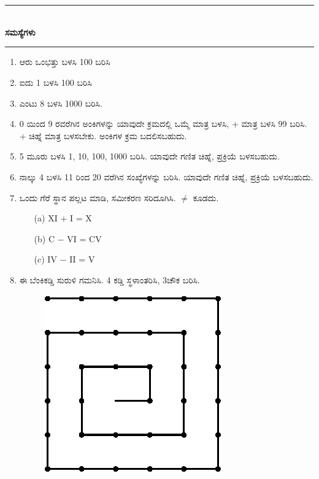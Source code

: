 \chapter[ಅಧ್ಯಾಯ 12]{}\label{chap12}

\begin{center}
\rule{5cm}{1pt}\\[5pt]
{\Large\bfseries ಸಮಸ್ಯೆಗಳು}\\[3pt]
\rule{5cm}{1pt}
\end{center}

\begin{enumerate}
\renewcommand{\labelenumi}{\bf\theenumi.}
\itemsep=5pt

\item ಆರು ಒಂಭತ್ತು ಬಳಸಿ 100 ಬರಿಸಿ 

\item ಐದು 1 ಬಳಸಿ 100 ಬರಿಸಿ

\item ಎಂಟು 8 ಬಳಸಿ 1000 ಬರಿಸಿ. 

\item 0 ಯಿಂದ 9 ರವರೆಗಿನ ಅಂಕಿಗಳನ್ನು ಯಾವುದೇ ಕ್ರಮದಲ್ಲಿ ಒಮ್ಮೆ ಮಾತ್ರ ಬಳಸಿ, $+$ ಮಾತ್ರ ಬಳಸಿ 99 ಬರಿಸಿ. $+$ ಚಿಹ್ನೆ ಮಾತ್ರ ಬಳಸಬೇಕು. ಅಂಕಿಗಳ ಕ್ರಮ ಬದಲಿಸ\break ಬಹುದು.

\item 5 ಮೂರು ಬಳಸಿ 1, 10, 100, 1000 ಬರಿಸಿ. ಯಾವುದೇ ಗಣಿತ ಚಿಹ್ನೆ, ಪ್ರಕ್ರಿಯೆ ಬಳಸಬಹುದು. 

\item ನಾಲ್ಕು 4 ಬಳಸಿ 11 ರಿಂದ 20 ವರೆಗಿನ ಸಂಖ್ಯೆಗಳನ್ನು ಬರಿಸಿ. ಯಾವುದೇ ಗಣಿತ ಚಿಹ್ನೆ, ಪ್ರಕ್ರಿಯೆ ಬಳಸಬಹುದು. 

\item ಒಂದು ಗೆರೆ ಸ್ಥಾನ ಪಲ್ಲಟ ಮಾಡಿ, ಸಮೀಕರಣ ಸರಿದೂಗಿಸಿ. $\neq$ ಕೂಡದು. 
\begin{itemize}
\item[(a)] XI $+$ I = X
\item[(b)] C $-$ VI = CV
\item[(c)] IV $-$ II = V
\end{itemize}

\eject

\item ಈ ಬೆಂಕಿಕಡ್ಡಿ ಸುರುಳಿ ಗಮನಿಸಿ. 4 ಕಡ್ಡಿ ಸ್ಥಳಾಂತರಿಸಿ, 3ಚೌಕ ಬರಿಸಿ. 
\begin{figure}[H]
\centering
\includegraphics{images/chap12/q8.eps}
\end{figure}


\end{enumerate}
